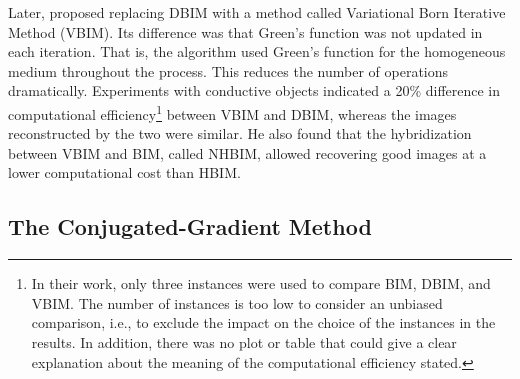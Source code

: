 			Later, \cite{zaiping2000variational} proposed replacing DBIM with a method called Variational Born Iterative Method (VBIM). Its difference was that Green's function was not updated in each iteration. That is, the algorithm used Green's function for the homogeneous medium throughout the process. This reduces the number of operations dramatically. Experiments with conductive objects indicated a 20\% difference in computational efficiency\footnote{In their work, only three instances were used to compare BIM, DBIM, and VBIM. The number of instances is too low to consider an unbiased comparison, i.e., to exclude the impact on the choice of the instances in the results. In addition, there was no plot or table that could give a clear explanation about the meaning of the computational efficiency stated.} between VBIM and DBIM, whereas the images reconstructed by the two were similar. He also found that the hybridization between VBIM and BIM, called NHBIM, allowed recovering good images at a lower computational cost than HBIM.
		
		\subsection{The Conjugated-Gradient Method}\label{chap:methods:deterministic:cg}
		
